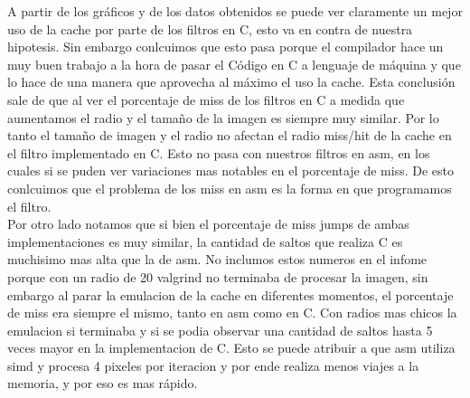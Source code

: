A partir de los gráficos y de los datos obtenidos se puede ver claramente un mejor uso de la cache por parte de los filtros en C, esto va en contra de nuestra hipotesis. Sin embargo conlcuimos que esto pasa porque el compilador hace un muy buen trabajo a la hora de pasar el Código en C a lenguaje de máquina y que lo hace de una manera que aprovecha al máximo el uso la cache. Esta conclusión sale de que al ver el porcentaje de miss de los filtros en C a medida que aumentamos el radio y el tamaño de la imagen es siempre muy similar. Por lo tanto el tamaño de imagen y el radio no afectan el radio miss/hit de la cache en el filtro implementado en  C. Esto no pasa con nuestros filtros en asm, en los cuales si se puden ver variaciones mas notables en el porcentaje de miss. De esto conlcuimos que el problema de los miss en asm es la forma en que programamos el filtro. \\
Por otro lado notamos que si bien el porcentaje de miss jumps de ambas implementaciones es muy similar, la cantidad de saltos que realiza C es muchisimo mas alta que la de asm. No inclumos estos numeros en el infome porque con un radio de 20 valgrind no terminaba de procesar la imagen, sin embargo al parar la emulacion de la cache en diferentes momentos, el porcentaje de miss era siempre el mismo, tanto en asm como en C. Con radios mas chicos la emulacion si terminaba y si se podia observar una cantidad de saltos hasta 5 veces mayor en la implementacion de C. Esto se puede atribuir a que asm utiliza simd y procesa 4 pixeles por iteracion y por ende realiza menos viajes a la memoria, y por eso es mas rápido.
